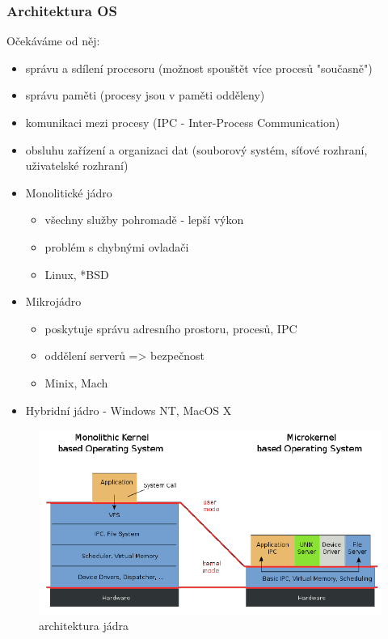 \documentclass[10pt,a4paper]{article}
\begin{document}
\subsubsection{Architektura OS}
Očekáváme od něj:
\begin{itemize}
	\item správu a sdílení procesoru (možnost spouštět více procesů "současně")
	\item správu paměti (procesy jsou v paměti odděleny)
	\item komunikaci mezi procesy (IPC - Inter-Process Communication)
	\item obsluhu zařízení a organizaci dat (souborový systém, síťové rozhraní, uživatelské rozhraní)
\end{itemize}

\begin{itemize}
	\item Monolitické jádro
	\begin{itemize}
		\item všechny služby pohromadě - lepší výkon
		\item problém s chybnými ovladači
		\item Linux, *BSD
	\end{itemize}
	\item Mikrojádro
	\begin{itemize}
		\item poskytuje správu adresního prostoru, procesů, IPC
		\item oddělení serverů => bezpečnost
		\item Minix, Mach
	\end{itemize}
	\item Hybridní jádro - Windows NT, MacOS X
\end{itemize}

\begin{figure} [h]
		\includegraphics[scale=0.8]{img/architektura_jadra.png}
		\caption{architektura jádra}
\end{figure}
\end{document}
